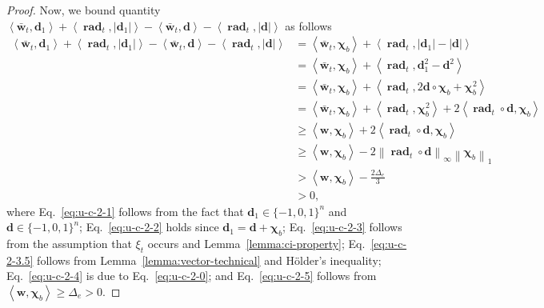 \documentclass{article}
\DeclareMathOperator{\rad}{rad}
\newcommand{\inn}[1]{\left\langle #1 \right\rangle}
\newcommand{\nor}[1]{\left\|#1\right\|}
\renewcommand{\vec}[1]{\boldsymbol{#1}}
\renewcommand{\odot}{\circ}
\begin{document}
\begin{proof}
Now, we bound quantity $\inn{\vec {\bar w}_t, \vec d_1}+\inn{\vec \rad_t, |\vec d_1|}
-\inn{\vec {\bar w}_t, \vec d}-\inn{\vec \rad_t,  |\vec d|}$ as follows
\begin{align}
\inn{\vec {\bar w}_t, \vec d_1}+\inn{\vec \rad_t, |\vec d_1|}
-\inn{\vec {\bar w}_t, \vec d}-\inn{\vec \rad_t,  |\vec d|}
& = \inn{\vec {\bar w}_t, \vec \chi_b} + \inn{\vec \rad_t, |\vec d_1|-|\vec d|} \nonumber\\
& =	\inn{\vec {\bar w}_t, \vec \chi_b} + \inn{\vec \rad_t, \vec d_1^2-\vec d^2} \label{eq:u-c-2-1} \\
& =	\inn{\vec {\bar w}_t, \vec \chi_b} + \inn{\vec \rad_t, 2\vec d\odot \vec \chi_b +\vec \chi_b^2} \label{eq:u-c-2-2} \\
& =	\inn{\vec {\bar w}_t, \vec \chi_b} + \inn{\vec \rad_t, \vec\chi_b^2} + 2\inn{\vec \rad_t\odot \vec d, \vec \chi_b} \nonumber \\
& \ge \inn{\vec w, \vec \chi_b}+2\inn{\vec \rad_t\odot \vec d, \vec \chi_b}  \label{eq:u-c-2-3} \\
& \ge \inn{\vec w, \vec \chi_b}-2\nor{\vec \rad_t\odot \vec d}_\infty\nor{\vec\chi_b}_1 \label{eq:u-c-2-3.5} \\
& > \inn{\vec w, \vec \chi_b}-\frac{2\Delta_e}{3} \label{eq:u-c-2-4} \\
& > 0 \label{eq:u-c-2-5},
\end{align}
where Eq.~\eqref{eq:u-c-2-1} follows from the fact that $\vec d_1\in \{-1,0,1\}^n$ and $\vec d \in \{-1,0,1\}^n$;
Eq.~\eqref{eq:u-c-2-2} holds since $\vec d_1=\vec d+\vec \chi_b$;
Eq.~\eqref{eq:u-c-2-3} follows from the assumption that $\xi_t$ occurs and Lemma~\ref{lemma:ci-property};
Eq.~\eqref{eq:u-c-2-3.5} follows from Lemma~\ref{lemma:vector-technical}  and H\"older's inequality;
Eq.~\eqref{eq:u-c-2-4} is due to Eq.~\eqref{eq:u-c-2-0};
and Eq.~\eqref{eq:u-c-2-5} follows from $\inn{\vec w,\vec\chi_b} \ge \Delta_e >0$.


\end{proof}
\end{document}
